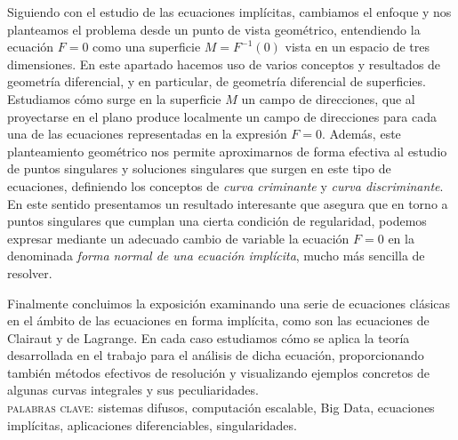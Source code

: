 Siguiendo con el estudio de las ecuaciones implícitas, cambiamos el enfoque y nos planteamos el problema desde un punto de vista geométrico, entendiendo la ecuación $F=0$ como una superficie $M=F^{-1}(0)$ vista en un espacio de tres dimensiones. En este apartado hacemos uso de varios conceptos y resultados de geometría diferencial, y en particular, de geometría diferencial de superficies. Estudiamos cómo surge en la superficie $M$ un campo de direcciones, que al proyectarse en el plano produce localmente un campo de direcciones para cada una de las ecuaciones representadas en la expresión $F=0$. Además, este planteamiento geométrico nos permite aproximarnos de forma efectiva al estudio de puntos singulares y soluciones singulares que surgen en este tipo de ecuaciones, definiendo los conceptos de \textit{curva criminante} y \textit{curva discriminante}. En este sentido presentamos un resultado interesante que asegura que en torno a puntos singulares que cumplan una cierta condición de regularidad, podemos expresar mediante un adecuado cambio de variable la ecuación $F=0$ en la denominada \textit{forma normal de una ecuación implícita}, mucho más sencilla de resolver.

Finalmente concluimos la exposición examinando una serie de ecuaciones clásicas en el ámbito de las ecuaciones en forma implícita, como son las ecuaciones de Clairaut y de Lagrange. En cada caso estudiamos cómo se aplica la teoría desarrollada en el trabajo para el análisis de dicha ecuación, proporcionando también métodos efectivos de resolución y visualizando ejemplos concretos de algunas curvas integrales y sus peculiaridades.\\

\noindent\textsc{palabras clave:} sistemas difusos, computación escalable, Big Data, ecuaciones implícitas, aplicaciones diferenciables, singularidades.
